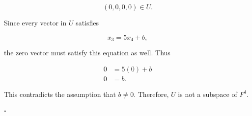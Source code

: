 \documentclass{article}
\begin{document}
\[
(0,0,0,0)\in U.
\]

Since every vector in $U$ satisfies

\[
x_3 = 5x_4 + b,
\]

the zero vector must satisfy this equation as well. Thus

\[
\begin{aligned}
0 &= 5(0) + b \\
0 &= b.
\end{aligned}
\]

This contradicts the assumption that $b \neq 0$. Therefore, $U$ is not a subspace of $F^4$.

\hfill$\square$
\end{document}
